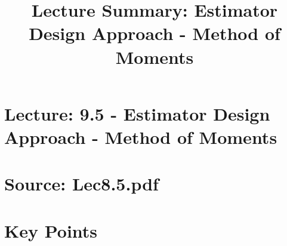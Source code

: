 \documentclass{article}
\title{Lecture Summary: Estimator Design Approach - Method of Moments}
\author{}
\date{}
\begin{document}
\maketitle

\section*{Lecture: 9.5 - Estimator Design Approach - Method of Moments}
\section*{Source: Lec8.5.pdf}

\section*{Key Points}
\end{document}
